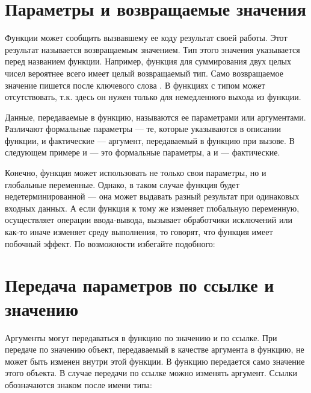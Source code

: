 \documentclass[book.tex]{subfiles}
\begin{document}
\section*{Параметры и возвращаемые значения}

Функции может сообщить вызвавшему ее коду результат своей работы. Этот результат называется возвращаемым значением. Тип этого значения указывается перед названием функции. Например, функция для суммирования двух целых чисел вероятнее всего имеет целый возвращаемый тип. Само возвращаемое значение пишется после ключевого слова . В функциях с типом    может отсутствовать, т.к. здесь он нужен только для немедленного выхода из функции.

Данные, передаваемые в функцию, называются ее параметрами или аргументами. Различают формальные параметры --- те, которые указываются в описании функции, и фактические --- аргумент, передаваемый в функцию при вызове. В следующем примере  и  --- это формальные параметры, а  и  --- фактические.


Конечно, функция может использовать не только свои параметры, но и глобальные переменные. Однако, в таком случае функция будет недетерминированной --- она может выдавать разный результат при одинаковых входных данных. А если функция к тому же изменяет глобальную переменную, осуществляет операции ввода-вывода, вызывает обработчики исключений или как-то иначе изменяет среду выполнения, то говорят, что функция имеет побочный эффект. По возможности избегайте подобного:


\section*{Передача параметров по ссылке и значению}

Аргументы могут передаваться в функцию по значению и по ссылке. При передаче по значению объект, передаваемый в качестве аргумента в функцию, не может быть изменен внутри этой функции. В функцию передается само значение этого объекта. В случае передачи по ссылке можно изменять аргумент. Ссылки обозначаются знаком \cppword{\&} после имени типа:

\end{document}
